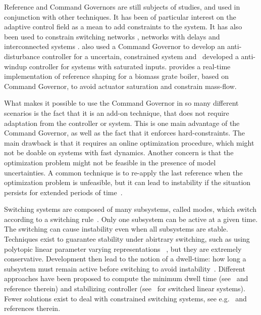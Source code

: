 Reference and Command Governors are still subjects of studies, and used in
conjunction with other techniques. It has been of particular interest on the
adaptive control field
\parencite{arabi.yucelen.ea:command,ristevski.dogan.ea:transient,wilcher.jaramillo.ea:on,dogan.yucelen.ea:improving,gruenwald.yucelen.ea:expanded,makavita.jayasinghe.ea:experimental}
as a mean to add constraints to the system. It has also been used to constrain
switching networks \parencite{ong.djamari.ea:governor}, networks with delays
\parencite{shen.song.ea:constrained} and interconnected systems
\parencite{tedesco.casavola:turn-based}. \textcite{peng.wang.ea:constrained}
also used a Command Governor to develop an anti-disturbance controller for a
uncertain, constrained system
and~\textcite{schwerdtner.bortoff.ea:projection-based} developed a anti-windup
controller for systems with saturated inputs.
\textcite{seeber.golles.ea:reference} provides a real-time implementation of
reference shaping for a biomass grate boiler, based on Command Governor, to
avoid actuator saturation and constrain mass-flow.

What makes it possible to use the Command Governor in so many different
scenarios is the fact that it is an add-on technique, that does not require
adaptation from the controller or system. This is one main advantage of the
Command Governor, as well as the fact that it enforces hard-constraints. The
main drawback is that it requires an online optimization procedure, which might
not be doable on systems with fast dynamics. Another concern is that the
optimization problem might not be feasible in the presence of model
uncertainties. A common technique is to re-apply the last reference when the
optimization problem is unfeasible, but it can lead to instability if the
situation persists for extended periods of
time~\parencite{garone.di-cairano.ea:reference}.

Switching systems are composed of many subsystems, called modes, which switch
according to a switching
rule~\parencite{liberzon:switching,liberzon.morse:basic}. Only one subsystem can
be active at a given time. The switching can cause instability even when all
subsystems are stable. Techniques exist to guarantee stability under abirtrary
switching, such as using polytopic linear parameter varying
representations~\parencite{deaecto.geromel.ea:robust} , but they are extremely
conservative. Development then lead to the notion of a dwell-time: how long a
subsystem must remain active before switching to avoid
instability~\parencite{liberzon.morse:basic}. Different approaches have been
proposed to compute the minimum dwell time
(see~\parencite{chesi.colaneri.ea:computing} and reference therein) and
stabilizing controller (see~\parencite{lin.antsaklis:stability} for switched
linear systems). Fewer solutions exist to deal with constrained switching
systems, see e.g.~\parencite{franzè.lucia.ea:command,lucia.franzè:stabilization}
and references therein.

